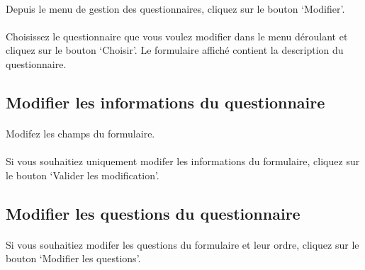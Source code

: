 \documentclass[french,12pt,a4paper,openany]{book}
\begin{document}
			\paragraph{}{Depuis le menu de gestion des questionnaires, cliquez sur le bouton `Modifier'.}
			\paragraph{}{Choisissez le questionnaire que vous voulez modifier dans le menu déroulant et cliquez sur le bouton `Choisir'. Le formulaire affiché contient la description du questionnaire.}
			\subsection{Modifier les informations du questionnaire}
				\paragraph{}{Modifez les champs du formulaire.}
				\paragraph{}{Si vous souhaitiez uniquement modifer les informations du formulaire, cliquez sur le bouton `Valider les modification'.}
			\subsection{Modifier les questions du questionnaire}
				\paragraph{}{Si vous souhaitiez modifer les questions du formulaire et leur ordre, cliquez sur le bouton `Modifier les questions'.}
\end{document}
